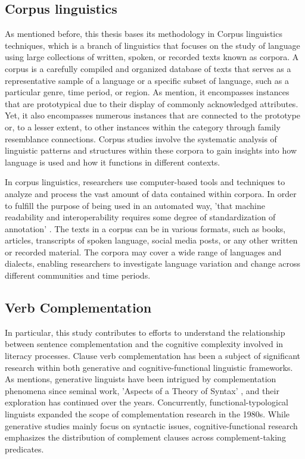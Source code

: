 \documentclass[final]{clv3} %
\begin{document}
\subsection{Corpus linguistics}
As mentioned before, this thesis bases its methodology in Corpus linguistics techniques, which is a branch of linguistics that focuses on the study of language using large collections of written, spoken, or recorded texts known as corpora. A corpus is a carefully compiled and organized database of texts that serves as a representative sample of a language or a specific subset of language, such as a particular genre, time period, or region. As \citet{gries2017linguistic} mention, it encompasses instances that are prototypical due to their display of commonly acknowledged attributes. Yet, it also encompasses numerous instances that are connected to the prototype or, to a lesser extent, to other instances within the category through family resemblance connections. Corpus studies involve the systematic analysis of linguistic patterns and structures within these corpora to gain insights into how language is used and how it functions in different contexts.

In corpus linguistics, researchers use computer-based tools and techniques to analyze and process the vast amount of data contained within corpora. In order to fulfill the purpose of being used in an automated way, 'that machine readability and interoperability requires some degree of standardization of annotation' \citep*[p.~393]{gries2017linguistic}. The texts in a corpus can be in various formats, such as books, articles, transcripts of spoken language, social media posts, or any other written or recorded material. The corpora may cover a wide range of languages and dialects, enabling researchers to investigate language variation and change across different communities and time periods.

\subsection{Verb Complementation}

In particular, this study contributes to efforts to understand the relationship between sentence complementation and the cognitive complexity involved in literacy processes. Clause verb complementation has been a subject of significant research within both generative and cognitive-functional linguistic frameworks. As \citet{cuyckens2014variability} mentions, generative linguists have been intrigued by complementation phenomena since \citeauthor{chomsky2014aspects} seminal work, 'Aspects of a Theory of Syntax' \citeyear{chomsky2014aspects} , and their exploration has continued over the years. Concurrently, functional-typological linguists expanded the scope of complementation research in the 1980s. While generative studies mainly focus on syntactic issues, cognitive-functional research emphasizes the distribution of complement clauses across complement-taking predicates.
\end{document}
